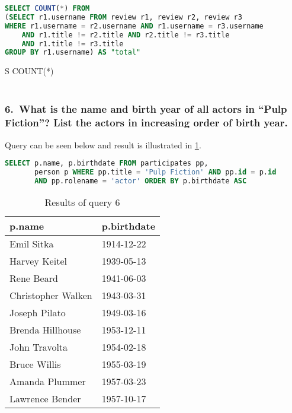 \begin{lstlisting}[language=SQL]
SELECT COUNT(*) FROM 
(SELECT r1.username FROM review r1, review r2, review r3
WHERE r1.username = r2.username AND r1.username = r3.username
    AND r1.title != r2.title AND r2.title != r3.title
    AND r1.title != r3.title
GROUP BY r1.username) AS "total"
\end{lstlisting}

\begin{table}
  \centering
  \begin{tabular}[htpb]{S}
    \toprule
    {COUNT(*)} \\
     \\
    \bottomrule
  \end{tabular}
  \caption{Results of query 5}\label{tab:5q5}
\end{table}

\subsubsection{6.\ What is the name and birth year of all actors in “Pulp Fiction”? List the actors in increasing order of birth year.}
Query can be seen below and result is illustrated in \cref{tab:5q6}.

\begin{lstlisting}[language=SQL]
SELECT p.name, p.birthdate FROM participates pp,
       person p WHERE pp.title = 'Pulp Fiction' AND pp.id = p.id
       AND pp.rolename = 'actor' ORDER BY p.birthdate ASC
\end{lstlisting}

\begin{table}
  \centering
  \begin{tabular}[htpb]{l l}
    \toprule
    p.name & p.birthdate \\
    \midrule
    Emil Sitka & 1914-12-22 \\
    Harvey Keitel & 1939-05-13 \\
    Rene Beard & 1941-06-03 \\
    Christopher Walken & 1943-03-31 \\
    Joseph Pilato & 1949-03-16 \\
    Brenda Hillhouse & 1953-12-11 \\
    John Travolta & 1954-02-18 \\
    Bruce Willis & 1955-03-19 \\
    Amanda Plummer & 1957-03-23 \\
    Lawrence Bender & 1957-10-17 \\
    \bottomrule
  \end{tabular}
  \caption{Results of query 6}\label{tab:5q6}
\end{table}

